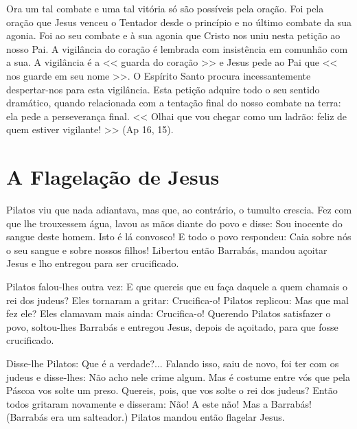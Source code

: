 \documentclass{rosario}
\begin{document}


Ora um tal combate e uma tal vitória só são possíveis pela oração.
Foi pela oração que Jesus venceu o Tentador desde o princípio e no último combate da sua agonia.
Foi ao seu combate e à sua agonia que Cristo nos uniu nesta petição ao nosso Pai.
A vigilância do coração é lembrada com insistência em comunhão com a sua.
A vigilância é a << guarda do coração >> e Jesus pede ao Pai que << nos guarde em seu nome >>.
O Espírito Santo procura incessantemente despertar-nos para esta vigilância.
Esta petição adquire todo o seu sentido dramático, quando relacionada com a tentação final do nosso combate na terra:
ela pede a perseverança final.
<< Olhai que vou chegar como um ladrão: feliz de quem estiver vigilante! >> (Ap 16, 15).


\section{A Flagelação de Jesus}


Pilatos viu que nada adiantava, mas que, ao contrário, o tumulto crescia.
Fez com que lhe trouxessem água, lavou as mãos diante do povo e disse:
Sou inocente do sangue deste homem.
Isto é lá convosco!
E todo o povo respondeu:
Caia sobre nós o seu sangue e sobre nossos filhos!
Libertou então Barrabás, mandou açoitar Jesus e lho entregou para ser crucificado.


Pilatos falou-lhes outra vez: E que quereis que eu faça daquele a quem chamais o rei dos judeus?
Eles tornaram a gritar: Crucifica-o!
Pilatos replicou:
Mas que mal fez ele?
Eles clamavam mais ainda: Crucifica-o!
Querendo Pilatos satisfazer o povo, soltou-lhes Barrabás e entregou Jesus, depois de açoitado, para que fosse crucificado.



Disse-lhe Pilatos: Que é a verdade?...
Falando isso, saiu de novo, foi ter com os judeus e disse-lhes:
Não acho nele crime algum.
Mas é costume entre vós que pela Páscoa vos solte um preso.
Quereis, pois, que vos solte o rei dos judeus?
Então todos gritaram novamente e disseram:
Não! A este não! Mas a Barrabás! (Barrabás era um salteador.)
Pilatos mandou então flagelar Jesus.
\end{document}

